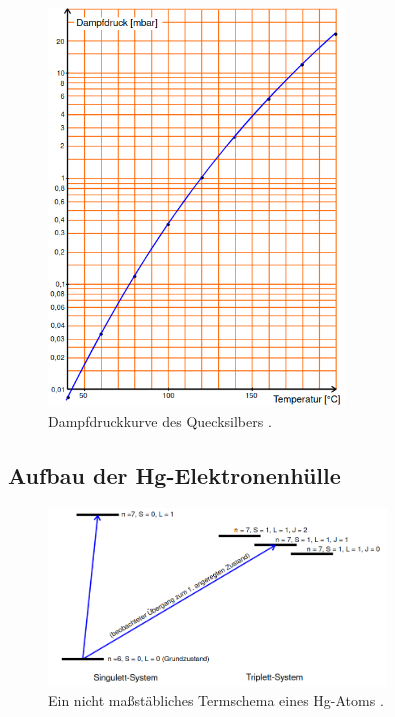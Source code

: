     \begin{figure}
        \centering 
        \includegraphics[width=0.7\textwidth]{bilder/Dampfdruckkurve.png}
        \caption{Dampfdruckkurve des Quecksilbers \cite{anleitung}.}
        \label{fig:dampfdruckkurve}
    \end{figure}

\subsection{Aufbau der Hg-Elektronenhülle}


    \begin{figure}
        \centering 
        \includegraphics[width=0.8\textwidth]{bilder/Termschema.png}
        \caption{Ein nicht maßstäbliches Termschema eines Hg-Atoms \cite{anleitung}.}
        \label{fig:termschema}
    \end{figure}

